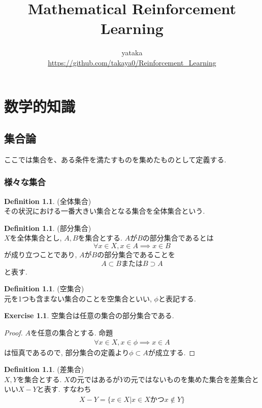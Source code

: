 \documentclass[11pt, a4paper, dvipdfmx]{jsbook}
\title{Mathematical Reinforcement Learning}
\author{yataka\\
          \url{https://github.com/takaya0/Reinforcement_Learning}}
\date{}
\theoremstyle{definition}
\newtheorem{Definition+}[Axiom+]{Definition}
\newtheorem{Exercise+}[Axiom+]{Exercise}
\begin{document}
\maketitle
\tableofcontents
\part{数学的知識}
\chapter{集合論}
ここでは集合を、ある条件を満たすものを集めたものとして定義する.
\section{様々な集合}
\begin{Definition+}(全体集合)\\
  その状況における一番大きい集合となる集合を全体集合という.
\end{Definition+}
\begin{Definition+}(部分集合)\\
  $X$を全体集合とし, $A, B$を集合とする. $A$が$B$の部分集合であるとは
  \begin{equation*}
    \forall x\in X,  x\in A \implies x \in B
  \end{equation*}
  が成り立つことであり, $A$が$B$の部分集合であることを
  \begin{equation*}
    A\subset B またはB \supset A
  \end{equation*}
  と表す.
\end{Definition+}
\begin{Definition+}(空集合)\\
  元を1つも含まない集合のことを空集合といい, $\phi$と表記する.
\end{Definition+}
\begin{Exercise+}
  空集合は任意の集合の部分集合である.
  \begin{proof}
    $A$を任意の集合とする. 命題
    \begin{align*}
      \forall x\in X, x\in \phi\implies x\in A 
    \end{align*}
    は恒真であるので, 部分集合の定義より$\phi\subset A$が成立する.
  \end{proof}
\end{Exercise+}
\begin{Definition+}(差集合)\\
  $X, Y$を集合とする. $X$の元ではあるが$Y$の元ではないものを集めた集合を差集合といい$X-Y$と表す. すなわち
  \begin{align*}
    X - Y = \{x\in X| x\in X かつx\notin Y\}
  \end{align*} 
\end{Definition+}
\end{document}
